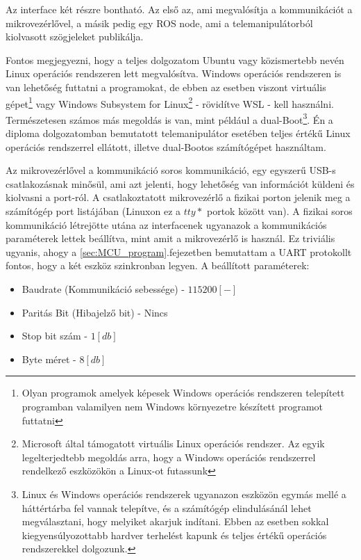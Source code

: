 Az interface két részre bontható. Az első az, ami megvalósítja a kommunikációt a mikrovezérlővel, a másik pedig egy ROS node, ami a telemanipulátorból kiolvasott szögjeleket publikálja.\cite{MogiHapticDevice}

Fontos megjegyezni, hogy a teljes dolgozatom Ubuntu vagy közismertebb nevén Linux operációs rendszeren lett megvalósítva. Windows operációs rendszeren is van lehetőség futtatni a programokat, de ebben az esetben viszont virtuális gépet\footnote{Olyan programok amelyek képesek Windows operációs rendszeren telepített programban valamilyen nem Windows környezetre készített programot futtatni} vagy Windows Subsystem for Linux\footnote{Microsoft által támogatott virtuális Linux operációs rendszer. Az egyik legelterjedtebb megoldás arra, hogy a Windows operációs rendszerrel rendelkező eszközökön a Linux-ot futassunk} - rövidítve WSL - kell használni. Természetesen számos más megoldás is van, mint például a dual-Boot\footnote{Linux és Windows operációs rendszerek ugyanazon eszközön egymás mellé a háttértárba fel vannak telepítve, és a számítógép elindulásánál lehet megválasztani, hogy melyiket akarjuk indítani. Ebben az esetben sokkal kiegyensúlyozottabb hardver terhelést kapunk és teljes értékű operációs rendszerekkel dolgozunk.}. Én a diploma dolgozatomban bemutatott telemanipulátor esetében teljes értékű Linux operációs rendszerrel ellátott, illetve dual-Bootos számítógépet használtam.\cite{MogiHapticDevice}\cite{ROSnoetic}

Az mikrovezérlővel a kommunikáció soros kommunikáció, egy egyszerű USB-s csatlakozásnak minősül, ami azt jelenti, hogy lehetőség van információt küldeni és kiolvasni a port-ról. A csatlakoztatott mikrovezérlő a fizikai porton jelenik meg a számítógép port listájában (Linuxon ez a $tty*$ portok között van). A fizikai soros kommunikáció létrejötte utána az interfacenek ugyanazok a kommunikációs paraméterek lettek beállítva, mint amit a mikrovezérlő is használ. Ez triviális ugyanis, ahogy a \ref{sec:MCU_program}.fejezetben bemutattam a UART protokollt fontos, hogy a két eszköz szinkronban legyen. A beállított paraméterek:\cite{MogiHapticDevice}\cite{ROSnoetic}

\begin{itemize}
\item Baudrate (Kommunikáció sebessége) - $115200 [-]$
\item Paritás Bit (Hibajelző bit) - Nincs
\item Stop bit szám - $1 [db]$
\item Byte méret - $8[db]$
\end{itemize}

